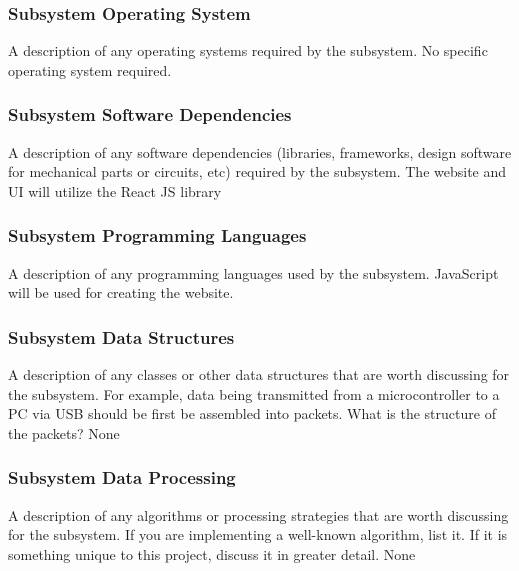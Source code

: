 \subsubsection{Subsystem Operating System}
A description of any operating systems required by the subsystem.
No specific operating system required.

\subsubsection{Subsystem Software Dependencies}
A description of any software dependencies (libraries, frameworks, design software for mechanical parts or circuits, etc) required by the subsystem.
The website and UI will utilize the React JS library

\subsubsection{Subsystem Programming Languages}
A description of any programming languages used by the subsystem.
JavaScript will be used for creating the website.

\subsubsection{Subsystem Data Structures}
A description of any classes or other data structures that are worth discussing for the subsystem. For example, data being transmitted from a microcontroller to a PC via USB should be first be assembled into packets. What is the structure of the packets?
None

\subsubsection{Subsystem Data Processing}
A description of any algorithms or processing strategies that are worth discussing for the subsystem. If you are implementing a well-known algorithm, list it. If it is something unique to this project, discuss it in greater detail.
None


